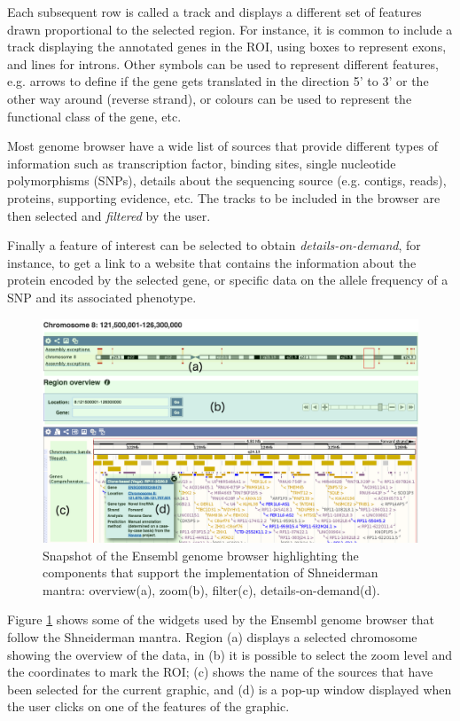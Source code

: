 Each subsequent row is called a track and displays a different set of features drawn proportional to the selected region. For instance, it is common to include a track displaying the annotated genes in the ROI, using boxes to represent exons, and lines for introns. Other symbols can be used to represent different features, e.g. arrows to define if the gene gets translated in the direction 5' to 3' or the other way around (reverse strand), or colours can be used to represent the functional class of the gene, etc.

Most genome browser have a wide list of sources that provide different types of information such as transcription factor, binding sites, single nucleotide polymorphisms (SNPs), details about the sequencing source (e.g. contigs, reads), proteins, supporting evidence, etc. The tracks to be included in the browser are then selected and \emph{filtered} by the user. 

Finally a feature of interest can be selected to obtain \emph{details-on-demand}, for instance, to get a link to a website that contains the information about the protein encoded by the selected gene, or specific data on the allele frequency of a SNP and its associated phenotype.

\begin{figure}  
\centering
\includegraphics[width=\textwidth]{figures/ensembl_snapshot.png}
\caption[Snapshot of the Ensembl genome browser.]{Snapshot of the Ensembl genome browser highlighting the components that support the implementation of Shneiderman mantra: overview(a), zoom(b), filter(c), details-on-demand(d).
\label{fig:ensembl_sn}}
\end{figure}

Figure \ref{fig:ensembl_sn} shows some of the widgets used by the Ensembl genome browser that follow the Shneiderman mantra. Region (a) displays a selected chromosome showing the overview of the data, in (b) it is possible to select the zoom level and the coordinates to mark the ROI; (c) shows the name of the sources that have been selected for the current graphic, and (d) is a pop-up window displayed when the user clicks on one of the features of the graphic.

